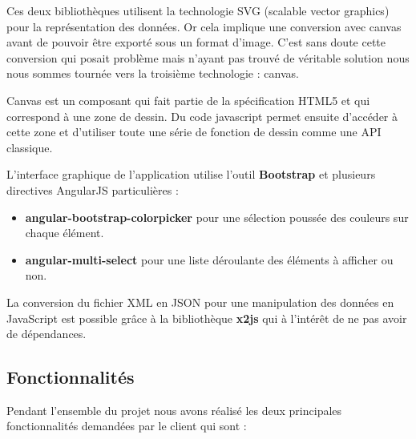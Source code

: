 \documentclass [a4paper,11pt]{article}
\begin{document}
Ces deux bibliothèques utilisent la technologie SVG (scalable vector graphics) pour la représentation des données. Or cela implique une conversion avec canvas avant de pouvoir être exporté sous un format d’image. C’est sans doute cette conversion qui posait problème mais n’ayant pas trouvé de véritable solution nous nous sommes tournée vers la troisième technologie : canvas.
\newline

Canvas est un composant qui fait partie de la spécification HTML5 et qui correspond à une zone de dessin. Du code javascript permet ensuite d’accéder à cette zone et d’utiliser toute une série de fonction de dessin comme une API classique.
\newline

L’interface graphique de l’application utilise l’outil \textbf{Bootstrap} et plusieurs directives AngularJS particulières :
\newline

\begin{itemize}
 \item \textbf{angular-bootstrap-colorpicker} pour une sélection poussée des couleurs sur chaque élément.
 \item \textbf{angular-multi-select} pour une liste déroulante des éléments à afficher ou non.
 \newline
\end{itemize}
\newline

La conversion du fichier XML en JSON pour une manipulation des données en JavaScript est possible grâce à la bibliothèque \textbf{x2js} qui à l’intérêt de ne pas avoir de dépendances.
\newline

\subsection{Fonctionnalités}

Pendant l'ensemble du projet nous avons réalisé les deux principales fonctionnalités demandées par le client qui sont : \newline
\end{document}
